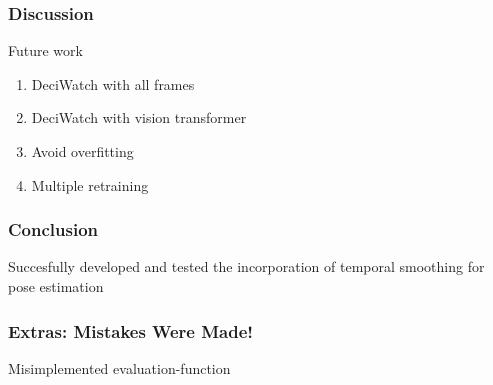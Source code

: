 \documentclass{beamer}
\begin{document}
\begin{frame}
    \frametitle{Discussion}
    Future work
    \begin{enumerate}
        \item<1-> DeciWatch with all frames
        \item<2-> DeciWatch with vision transformer
        \item<3-> Avoid overfitting
        \item<4-> Multiple retraining
    \end{enumerate}
\end{frame}

\begin{frame}
    \frametitle{Conclusion}
    Succesfully developed and tested the incorporation of temporal smoothing for pose estimation
\end{frame}

\begin{frame}
    \frametitle{Extras: Mistakes Were Made!}
    Misimplemented evaluation-function
\end{frame}
\end{document}

